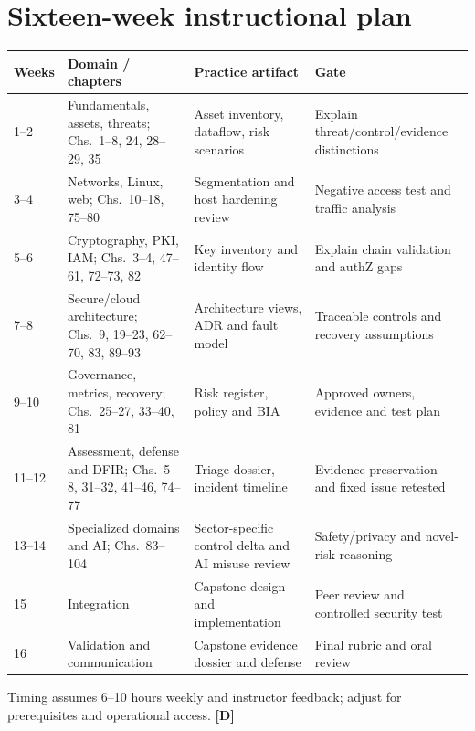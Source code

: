 \documentclass[10pt,letterpaper,oneside]{article}
\newcommand{\designed}{\textsf{\color{accent}\textbf{[D]}}}
\begin{document}
\section{Sixteen-week instructional plan}
\par\medskip\noindent\begin{longtable}{@{}p{}p{}p{}p{}@{}}\toprule
Weeks & Domain / chapters & Practice artifact & Gate \\ \midrule\endhead
1--2 & Fundamentals, assets, threats; Chs.~1--8, 24, 28--29, 35 & Asset inventory, dataflow, risk scenarios & Explain threat/control/evidence distinctions\\
3--4 & Networks, Linux, web; Chs.~10--18, 75--80 & Segmentation and host hardening review & Negative access test and traffic analysis\\
5--6 & Cryptography, PKI, IAM; Chs.~3--4, 47--61, 72--73, 82 & Key inventory and identity flow & Explain chain validation and authZ gaps\\
7--8 & Secure/cloud architecture; Chs.~9, 19--23, 62--70, 83, 89--93 & Architecture views, ADR and fault model & Traceable controls and recovery assumptions\\
9--10 & Governance, metrics, recovery; Chs.~25--27, 33--40, 81 & Risk register, policy and BIA & Approved owners, evidence and test plan\\
11--12 & Assessment, defense and DFIR; Chs.~5--8, 31--32, 41--46, 74--77 & Triage dossier, incident timeline & Evidence preservation and fixed issue retested\\
13--14 & Specialized domains and AI; Chs.~83--104 & Sector-specific control delta and AI misuse review & Safety/privacy and novel-risk reasoning\\
15 & Integration & Capstone design and implementation & Peer review and controlled security test\\
16 & Validation and communication & Capstone evidence dossier and defense & Final rubric and oral review\\
\bottomrule\end{longtable}\par\medskip
Timing assumes 6--10 hours weekly and instructor feedback; adjust for prerequisites and operational access. \designed{}
\end{document}
